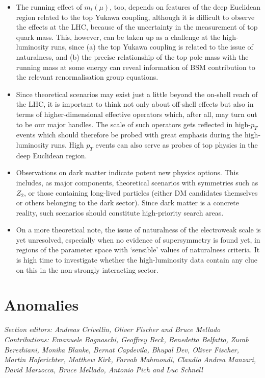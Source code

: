\documentclass[10pt]{article}
\begin{document}
\begin{itemize}
	\item The running effect of $m_t(\mu)$, too, depends on features of the deep Euclidean region related to the top Yukawa coupling, although it is difficult to observe the effects at the LHC, because of the uncertainty
	in the measurement of top quark mass. This, however, can be taken up as a challenge at the high-luminosity
	runs, since (a) the top Yukawa coupling is related to the issue of naturalness, and (b) the precise relationship
	of the top pole mass with the running mass at some energy can reveal information of BSM contribution
	to the relevant renormalisation group equations.
	
	\item Since theoretical scenarios may exist just a little beyond the on-shell reach of the LHC, it is important to think not only about off-shell effects but also in terms of higher-dimensional effective operators which,
	after all, may turn out to be our major handles. The scale of such operators gets reflected in high-$p_T$ events which should therefore be probed with great emphasis during the high-luminosity runs. High $p_T$ events can also serve as probes of top physics in the deep Euclidean region.
	
	\item Observations on dark matter indicate potent new physics options. This includes, as major components, theoretical scenarios with symmetries such as $Z_2$, or those containing long-lived particles (either DM candidates themselves or others belonging to the dark sector). Since dark 
	matter is a concrete reality, such scenarios should constitute high-priority search areas.
	
	\item On a more theoretical note, the issue of naturalness of the electroweak scale is yet unresolved, especially when no evidence of supersymmetry is found yet, in regions of the parameter space with `sensible'  values of naturalness criteria. It is high time to investigate whether the high-luminosity data contain any clue on this in the non-strongly interacting sector.
\end{itemize}


\section{Anomalies}  
\label{sec:anomalies}
%
{\it\small Section editors: Andreas Crivellin, Oliver Fischer and Bruce Mellado\\
%
Contributions: Emanuele Bagnaschi, Geoffrey Beck, Benedetta Belfatto, Zurab Berezhiani, Monika Blanke, Bernat Capdevila, Bhupal Dev, Oliver Fischer, Martin Hoferichter, Matthew Kirk, Farvah Mahmoudi, Claudio Andrea Manzari,  David Marzocca, Bruce Mellado, Antonio Pich and Luc Schnell
}
\end{document}
